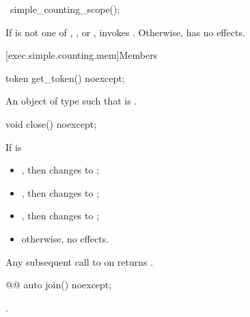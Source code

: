 %
\begin{itemdecl}
~simple_counting_scope();
\end{itemdecl}

\begin{itemdescr}
\pnum
\effects
If  is not one of
, , or ,
invokes .
Otherwise, has no effects.
\end{itemdescr}

[exec.simple.counting.mem]{Members}

%
\begin{itemdecl}
token get_token() noexcept;
\end{itemdecl}

\begin{itemdescr}
\pnum
\returns
An object  of type  such that
 is .
\end{itemdescr}

%
\begin{itemdecl}
void close() noexcept;
\end{itemdecl}

\begin{itemdescr}
\pnum
\effects
If  is
\begin{itemize}
\item
{}, then changes  to ;
\item
{}, then changes  to ;
\item
{},
then changes  to ;
\item
otherwise, no effects.
\end{itemize}

\pnum
\ensures
Any subsequent call to  on 
returns .
\end{itemdescr}

%
\begin{itemdecl}
@@ auto join() noexcept;
\end{itemdecl}

\begin{itemdescr}
\pnum
\returns
{}.
\end{itemdescr}

